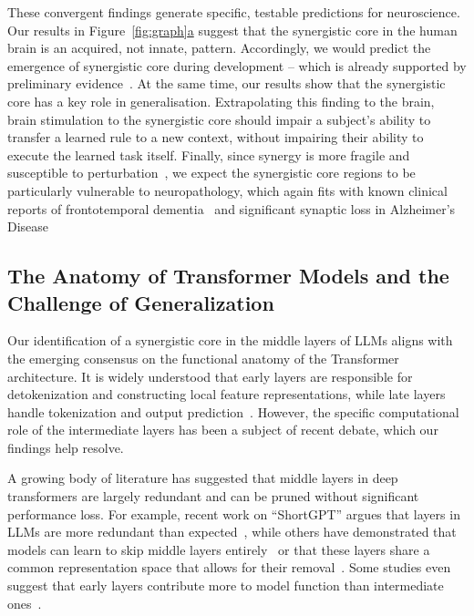 \documentclass[11pt,a4paper]{ouparticle}
\newcommand\figsubref[2]{\hyperref[#1]{\ref*{#1}#2}}
\begin{document}
These convergent findings generate specific, testable predictions for neuroscience. Our results in Figure~\figsubref{fig:graph}{a} suggest that the synergistic core in the human brain is an acquired, not innate, pattern. Accordingly, we would predict the emergence of synergistic core during development -- which is already supported by preliminary evidence~\cite{varley2025emergence}. 
At the same time, our results show that the synergistic core has a key role in generalisation. Extrapolating this finding to the brain, brain stimulation to the synergistic core should impair a subject's ability to transfer a learned rule to a new context, without impairing their ability to execute the learned task itself.
Finally, since synergy is more fragile and susceptible to perturbation~\cite{mediano2022integrated}, we expect the synergistic core regions to be particularly vulnerable to neuropathology, which again fits with known clinical reports of frontotemporal dementia~\cite{bang2015frontotemporal} and significant synaptic loss in Alzheimer's Disease~\cite{dekosky1990synapse}


\subsection*{The Anatomy of Transformer Models and the Challenge of Generalization}

Our identification of a synergistic core in the middle layers of LLMs aligns with the emerging consensus on the functional anatomy of the Transformer architecture. It is widely understood that early layers are responsible for detokenization and constructing local feature representations, while late layers handle tokenization and output prediction~\cite{elhage2021mathematical}. However, the specific computational role of the intermediate layers has been a subject of recent debate, which our findings help resolve.

A growing body of literature has suggested that middle layers in deep transformers are largely redundant and can be pruned without significant performance loss. For example, recent work on ``ShortGPT'' argues that layers in LLMs are more redundant than expected~\cite{men2025shortgpt}, while others have demonstrated that models can learn to skip middle layers entirely~\cite{lawson2025learning} or that these layers share a common representation space that allows for their removal~\cite{sun2025transformer}. Some studies even suggest that early layers contribute more to model function than intermediate ones~\cite{singhal2025impact}.
\end{document}
